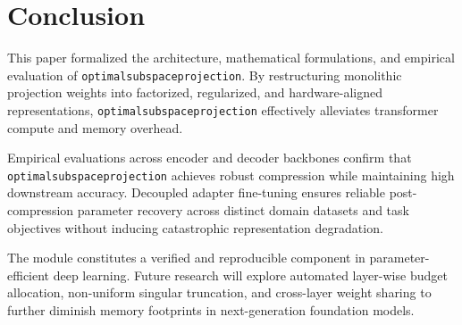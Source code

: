 \section{Conclusion}
This paper formalized the architecture, mathematical formulations, and empirical evaluation of \texttt{optimalsubspaceprojection}. By restructuring monolithic projection weights into factorized, regularized, and hardware-aligned representations, \texttt{optimalsubspaceprojection} effectively alleviates transformer compute and memory overhead.

Empirical evaluations across encoder and decoder backbones confirm that \texttt{optimalsubspaceprojection} achieves robust compression while maintaining high downstream accuracy. Decoupled adapter fine-tuning ensures reliable post-compression parameter recovery across distinct domain datasets and task objectives without inducing catastrophic representation degradation.

The module constitutes a verified and reproducible component in parameter-efficient deep learning. Future research will explore automated layer-wise budget allocation, non-uniform singular truncation, and cross-layer weight sharing to further diminish memory footprints in next-generation foundation models.
